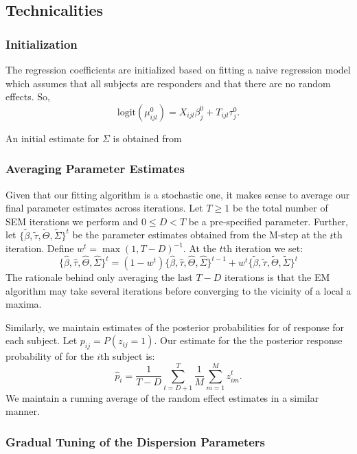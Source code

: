 \documentclass{article}
\begin{document}
\subsection{Technicalities}
\subsubsection{Initialization}
The regression coefficients are initialized based on fitting a naive regression model which assumes that all subjects are responders and that there are no random effects. So, 
$$
\text{logit}(\mu^0_{ijl}) = X_{ijl}\beta_j^0 + T_{ijl}\tau_j^0.
$$

An initial estimate for $\Sigma$ is obtained from 

\subsubsection{Averaging Parameter Estimates}
Given that our fitting algorithm is a stochastic one, it makes sense to average our final parameter estimates across iterations. Let $T\geq1$ be the total number of SEM iterations we perform and $0\leq D < T$ be a pre-specified parameter. Further, let $\{\tilde\beta,\tilde\tau,\tilde\Theta,\tilde\Sigma\}^{t}$ be the parameter estimates obtained from the M-step at  the $t$th iteration. Define $w^{t} = \max(1, T-D)^{-1}$. At the $t$th iteration we set:
$$
\{\hat\beta,\hat\tau,\hat\Theta,\hat\Sigma\}^{t} = 
(1 - w^t)\{\hat\beta,\hat\tau,\hat\Theta,\hat\Sigma\}^{t-1} +
w^t\{\tilde\beta,\tilde\tau,\tilde\Theta,\tilde\Sigma\}^{t}
$$
The rationale behind only averaging the last $T - D$ iterations is that the EM algorithm may take several iterations before converging to the vicinity of a local a maxima.  


Similarly, we maintain estimates of the posterior probabilities for of response for each subject. Let $p_{ij} = P(z_{ij} = 1)$. Our estimate for the the posterior response probability of for the $i$th subject is:
$$
\hat{p}_i = \frac{1}{T-D}\sum_{t=D+1}^{T}\frac{1}{M}\sum_{m=1}^{M}z_{im}^t.
$$
We maintain a running average of the random effect estimates in a similar manner. 

\subsubsection{Gradual Tuning of the Dispersion Parameters}
\end{document}
